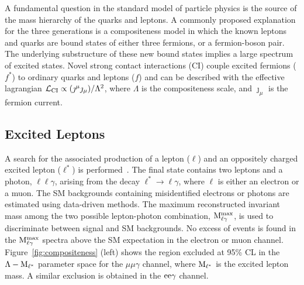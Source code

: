 \documentclass[11pt]{article}
\begin{document}
A fundamental question in the standard model of particle physics is the source of the 
mass hierarchy of the quarks and leptons. A commonly proposed explanation for the three 
generations is a compositeness model in which the known leptons and quarks are bound states 
of either three fermions, or a fermion-boson pair. The underlying substructure of these new 
bound states implies a large spectrum of excited states. Novel strong contact interactions (CI) 
couple excited fermions ($f^\ast$) to ordinary quarks and leptons ($f$) and can be described 
with the effective lagrangian $\mathcal{L}_{\rm{CI}} \propto (\jmath^\mu \jmath_\mu) / \Lambda^{2} $, 
where $\Lambda$ is the compositeness scale, and $\jmath_\mu$ is the fermion current. 

\subsection{Excited Leptons}
A search for the associated production of a lepton ($\ell$) and an oppositely 
charged excited lepton ($\ell^{\ast}$) is performed~\cite{CMSPAPER:EXO-10-016}. 
The final state contains two leptons and a photon, $\ell\ell\gamma$, arising 
from the decay $\ell^{\ast} \rightarrow \ell \gamma$, where $\ell$ is either an electron or a muon.
The SM backgrounds containing misidentified electrons or photons are estimated using 
data-driven methods. The maximum reconstructed invariant mass among the 
two possible lepton-photon combination, $\rm{M}^{max}_{\ell\gamma}$,
is used to discriminate between signal and SM backgrounds.
No excess of events is found in the $\rm{M}^{max}_{\ell\gamma}$ spectra 
above the SM expectation in the electron or muon channel. Figure~\ref{fig:compositeness} (left) 
shows the region excluded at 95\% CL in the $\Lambda - \rm{M}_{\ell^\ast}$ parameter space for 
the $\mu\mu\gamma$ channel, where $\rm{M}_{\ell^\ast}$ is the excited lepton mass.
A similar exclusion is obtained in the $\rm{ee}\gamma$ channel.
\end{document}
